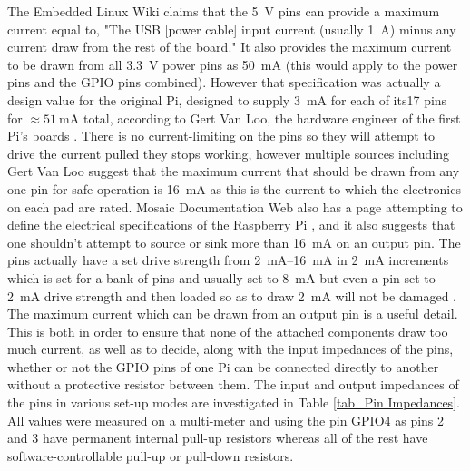 \documentclass[../main.tex]{subfiles}
\begin{document}
The Embedded Linux Wiki \cite{web_RpiMaxRatings} claims that the \SI{5}{\volt} pins can provide a maximum current equal to, "The USB [power cable] input current (usually \SI{1}{\ampere}) minus any current draw from the rest of the board."
It also provides the maximum current to be drawn from all \SI{3.3}{\volt} power pins as \SI{50}{\milli\ampere} (this would apply to the power pins and the GPIO pins combined).
However that specification was actually a design value for the original Pi, designed to supply \SI{3}{\milli\ampere} for each of its17 pins for $\approx \SI{51}{\milli\ampere}$ total, according to Gert Van Loo, the hardware engineer of the first Pi's boards \cite{web_RPiSpecsSE}.
There is no current-limiting on the pins so they will attempt to drive the current pulled they stops working, however multiple sources including Gert Van Loo suggest that the maximum current that should be drawn from any one pin for safe operation is \SI{16}{\milli\ampere} as this is the current to which the electronics on each pad are rated.
Mosaic Documentation Web also has a page attempting to define the electrical specifications of the Raspberry Pi \cite{web_MosaicSpecs}, and it also suggests that one shouldn't attempt to source or sink more than \SI{16}{\milli\ampere} on an output pin.
The pins actually have a set drive strength from \SIrange{2}{16}{\milli\ampere} in \SI{2}{\milli\ampere} increments which is set for a bank of pins and usually set to \SI{8}{\milli\ampere} but even a pin set to \SI{2}{\milli\ampere} drive strength and then loaded so as to draw \SI{2}{\milli\ampere} will not be damaged \cite{web_GPIOPadsErrata}.\\

The maximum current which can be drawn from an output pin is a useful detail.
This is both in order to ensure that none of the attached components draw too much current, as well as to decide, along with the input impedances of the pins, whether or not the GPIO pins of one Pi can be connected directly to another without a protective resistor between them.
The input and output impedances of the pins in various set-up modes are investigated in Table \ref{tab_Pin Impedances}.
All values were measured on a multi-meter and using the pin GPIO4 as pins 2 and 3 have permanent internal pull-up resistors whereas all of the rest have software-controllable pull-up or pull-down resistors.\\
\end{document}
